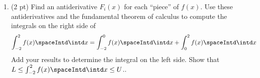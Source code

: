 


\begin{enumerate}[resume,label=(\alph*)]
\item\label{itm : RQ14Ac} (2 pt) Find an antiderivative $F_{i}(x)$ for each ``piece'' of $f(x)$. Use these antiderivatives and the fundamental theorem of calculus to compute the integrals on the right side of
\begin{align*}
\int_{-2}^{2} f(x) \spaceIntd \intd x
=
\int_{-2}^{0} f(x) \spaceIntd \intd x
+
\int_{0}^{2} f(x) \spaceIntd \intd x%
\label{eq : RQ14A Piecewise Integral}
\end{align*}
Add your results to determine the integral on the left side. Show that $L \leq \int_{-2}^{2} f(x) \spaceIntd \intd x \leq U$..
\end{enumerate}

\spaceSolution{1in}{%
}%
